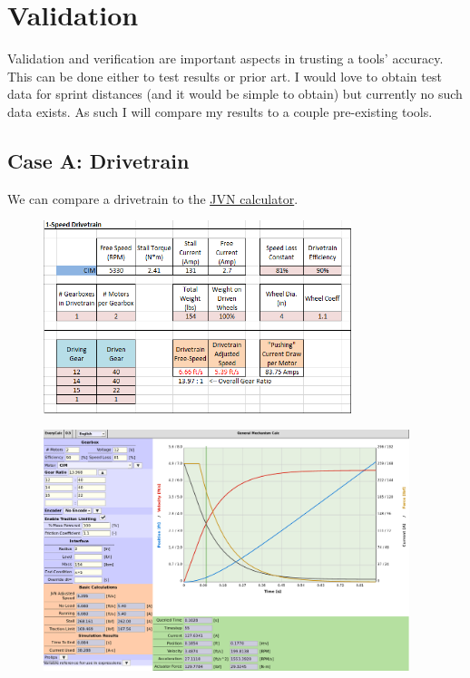 \documentclass[10pt,letterpaper]{article}
\begin{document}
	\section{Validation}
	Validation and verification are important aspects in trusting a tools' accuracy. This can be done either to test results or prior art. I would love to obtain test data for sprint distances (and it would be simple to obtain) but currently no such data exists. As such I will compare my results to a couple pre-existing tools.

	\newpage
	\subsection*{Case A: Drivetrain}
	We can compare a drivetrain to the \href{https://www.chiefdelphi.com/t/paper-jvns-mechanical-design-calculator-2016/146281}{\underline{JVN calculator}}.

	\begin{figure}[H]
		\includegraphics[width=0.80\textwidth]{validation/mechanism_JVN_A.png}
	\end{figure}

	\begin{figure}[H]
		\includegraphics[width=0.95\textwidth]{validation/mechanism_EC_A.png}
	\end{figure}
\end{document}
